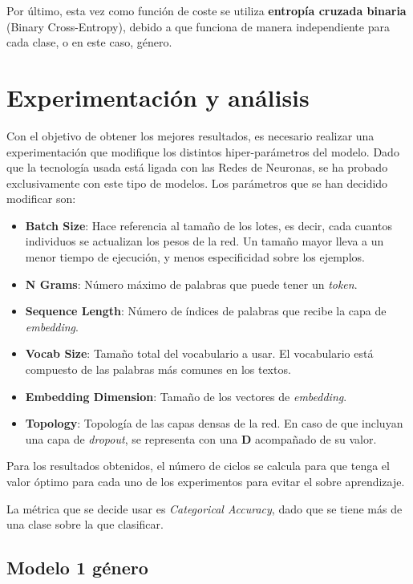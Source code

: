 \documentclass[12pt,a4paper, xcolor=table]{article}
\begin{document}
Por último, esta vez como función de coste se utiliza \textbf{entropía cruzada binaria} (Binary Cross-Entropy), debido a que funciona de manera independiente para cada clase, o en este caso, género.

\newpage

\section{Experimentación y análisis}

Con el objetivo de obtener los mejores resultados, es necesario realizar una experimentación que modifique los distintos hiper-parámetros del modelo. Dado que la tecnología usada está ligada con las Redes de Neuronas, se ha probado exclusivamente con este tipo de modelos. Los parámetros que se han decidido modificar son:

\begin{itemize}
  \item \textbf{Batch Size}: Hace referencia al tamaño de los lotes, es decir, cada cuantos individuos se actualizan los pesos de la red. Un tamaño mayor lleva a un menor tiempo de ejecución, y menos especificidad sobre los ejemplos.
  \item \textbf{N Grams}: Número máximo de palabras que puede tener un \textit{token}.
  \item \textbf{Sequence Length}: Número de índices de palabras que recibe la capa de \textit{embedding}.
  \item \textbf{Vocab Size}: Tamaño total del vocabulario a usar. El vocabulario está compuesto de las palabras más comunes en los textos.
  \item \textbf{Embedding Dimension}: Tamaño de los vectores de \textit{embedding}.
  \item \textbf{Topology}: Topología de las capas densas de la red. En caso de que incluyan una capa de \textit{dropout}, se representa con una \textbf{D} acompañado de su valor.
\end{itemize}

Para los resultados obtenidos, el número de ciclos se calcula para que tenga el valor óptimo para cada uno de los experimentos para evitar el sobre aprendizaje.

\vspace{2mm}

La métrica que se decide usar es \textit{Categorical Accuracy}, dado que se tiene más de una clase sobre la que clasificar.


\subsection{Modelo 1 género}
\end{document}
